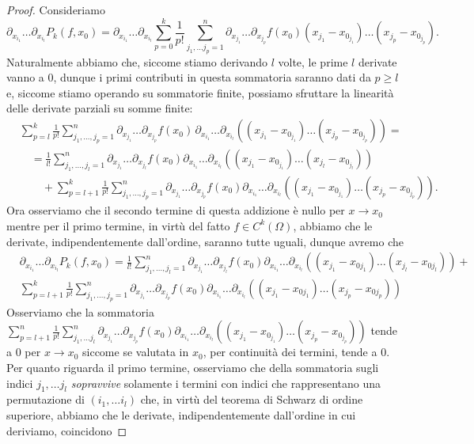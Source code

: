 \documentclass[openany, italian]{book}
\begin{document}
\begin{proof}
Consideriamo
$$
\partial_{x_{i_1}} \ldots \partial_{x_{i_l}} P_k(f, x_0) = \partial_{x_{i_1}} \ldots \partial_{x_{i_l}} \sum_{p=0}^{k} \frac{1}{p!} \sum_{j_1, \ldots j_p = 1}^n \partial_{x_{j_1}} \ldots \partial_{x_{j_p}} f(x_0)(x_{j_1} - x_{0_{j_1}}) \ldots (x_{j_p} - x_{0_{j_p}}).
$$
Naturalmente abbiamo che, siccome stiamo derivando $l$ volte, le prime $l$ derivate vanno a $0$, dunque i primi contributi in questa sommatoria saranno dati da $p \geq l$ e, siccome stiamo operando su sommatorie finite, possiamo sfruttare la linearità delle derivate parziali su somme finite:
\begin{align*}
&\sum_{p=l}^k \frac{1}{p!} \sum_{j_1, \ldots, j_p = 1}^n \partial_{x_{j_1}} \ldots \partial_{x_{j_p}} f(x_0) \, \partial_{x_{i_1}} \ldots \partial_{x_{i_l}} \left( (x_{j_1} - x_{0_{j_1}}) \ldots (x_{j_p} - x_{0_{j_p}}) \right) = \\
&\quad = \frac{1}{l!} \sum_{j_1, \ldots, j_l = 1}^n \partial_{x_{j_1}} \ldots \partial_{x_{j_l}} f(x_0) \partial_{x_{i_1}} \ldots \partial_{x_{i_l}} \left( (x_{j_1} - x_{0_{j_1}}) \ldots (x_{j_l} - x_{0_{j_l}}) \right) \\
&\quad\quad + \sum_{p=l+1}^k \frac{1}{p!} \sum_{j_1, \ldots, j_p = 1}^n \partial_{x_{j_1}} \ldots \partial_{x_{j_p}} f(x_0) \partial_{x_{i_1}} \ldots \partial_{x_{i_l}} \left( (x_{j_1} - x_{0_{j_1}}) \ldots (x_{j_p} - x_{0_{j_p}}) \right).
\end{align*}
Ora osserviamo che il secondo termine di questa addizione è nullo per $x \to x_0$ mentre per il primo termine, in virtù del fatto $f \in C^k (\Omega)$, abbiamo che le derivate, indipendentemente dall'ordine, saranno tutte uguali, dunque avremo che
\begin{align*}
&\partial_{x_{i_1}} \ldots \partial_{x_{i_l}} P_k(f, x_0) = \frac{1}{l!} \sum_{j_1, \ldots, j_l = 1}^n \partial_{x_{j_1}} \ldots \partial_{x_{j_l}} f(x_0) \partial_{x_{i_1}} \ldots \partial_{x_{i_l}} \left( (x_{j_1} - x_{0j_1}) \ldots (x_{j_l} - x_{0j_l}) \right) + \\
&\sum_{p=l+1}^k \frac{1}{p!} \sum_{j_1, \ldots, j_p = 1}^n \partial_{x_{j_1}} \ldots \partial_{x_{j_p}} f(x_0) \partial_{x_{i_1}} \ldots \partial_{x_{i_l}} \left( (x_{j_1} - x_{0j_1}) \ldots (x_{j_p} - x_{0j_p}) \right)
\end{align*}
Osserviamo che la sommatoria $\sum\limits_{p=l+1}^n \frac{1}{p!} \sum\limits_{j_1, \ldots j_l}^n \partial_{x_{j_1}} \ldots \partial_{x_{j_p}} f(x_0) \partial_{x_{i_1}} \ldots \partial_{x_{i_l}} \left( (x_{j_1} - x_{0_{j_1}}) \ldots (x_{j_p} - x_{0_{j_p}}) \right)$ tende a $0$ per $x \to x_0$ siccome se valutata in $x_0$, per continuità dei termini, tende a $0$. Per quanto riguarda il primo termine, osserviamo che della sommatoria sugli indici $j_1, \ldots j_l$ \emph{sopravvive} solamente i termini con indici che rappresentano una permutazione di $(i_1, \ldots i_l)$ che, in virtù del teorema di Schwarz di ordine superiore, abbiamo che le derivate, indipendentemente dall'ordine in cui deriviamo, coincidono

\end{proof}
\end{document}
